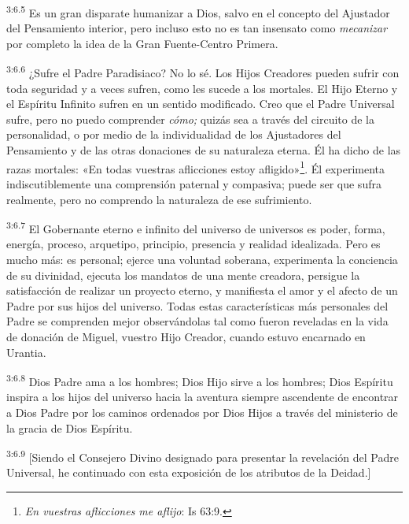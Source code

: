 \par
\textsuperscript{3:6.5} Es un gran disparate humanizar a Dios, salvo en el concepto del Ajustador del Pensamiento interior, pero incluso esto no es tan insensato como \textit{mecanizar} por completo la idea de la Gran Fuente-Centro Primera.

\par
\textsuperscript{3:6.6} ¿Sufre el Padre Paradisiaco? No lo sé. Los Hijos Creadores pueden sufrir con toda seguridad y a veces sufren, como les sucede a los mortales. El Hijo Eterno y el Espíritu Infinito sufren en un sentido modificado. Creo que el Padre Universal sufre, pero no puedo comprender \textit{cómo;} quizás sea a través del circuito de la personalidad, o por medio de la individualidad de los Ajustadores del Pensamiento y de las otras donaciones de su naturaleza eterna. Él ha dicho de las razas mortales: «En todas vuestras aflicciones estoy afligido»\footnote{\textit{En vuestras aflicciones me aflijo}: Is 63:9.}. Él experimenta indiscutiblemente una comprensión paternal y compasiva; puede ser que sufra realmente, pero no comprendo la naturaleza de ese sufrimiento.

\par
\textsuperscript{3:6.7} El Gobernante eterno e infinito del universo de universos es poder, forma, energía, proceso, arquetipo, principio, presencia y realidad idealizada. Pero es mucho más: es personal; ejerce una voluntad soberana, experimenta la conciencia de su divinidad, ejecuta los mandatos de una mente creadora, persigue la satisfacción de realizar un proyecto eterno, y manifiesta el amor y el afecto de un Padre por sus hijos del universo. Todas estas características más personales del Padre se comprenden mejor observándolas tal como fueron reveladas en la vida de donación de Miguel, vuestro Hijo Creador, cuando estuvo encarnado en Urantia.

\par
\textsuperscript{3:6.8} Dios Padre ama a los hombres; Dios Hijo sirve a los hombres; Dios Espíritu inspira a los hijos del universo hacia la aventura siempre ascendente de encontrar a Dios Padre por los caminos ordenados por Dios Hijos a través del ministerio de la gracia de Dios Espíritu.

\par
\textsuperscript{3:6.9} [Siendo el Consejero Divino designado para presentar la revelación del Padre Universal, he continuado con esta exposición de los atributos de la Deidad.]